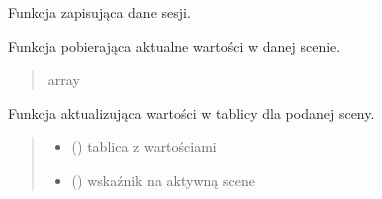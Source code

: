 \documentclass[a4paper,10pt,openany,english]{sphinxmanual}
\begin{document}

\begin{fulllineitems}
\label{\detokenize{js/js-functions:saveSessionData}}
\pysigstartsignatures
\pysiglinewithargsret
{}
{}
{}
\pysigstopsignatures
\sphinxAtStartPar
Funkcja zapisująca dane sesji.

\end{fulllineitems}


\begin{fulllineitems}
\label{\detokenize{js/js-functions:fetchSceneValues}}
\pysigstartsignatures
\pysiglinewithargsret
{}
{}
{}
\pysigstopsignatures
\sphinxAtStartPar
Funkcja pobierająca aktualne wartości w danej scenie.
\begin{quote}\begin{description}
\sphinxAtStartPar
array

\end{description}\end{quote}

\end{fulllineitems}


\begin{fulllineitems}
\label{\detokenize{js/js-functions:updateSceneValues}}
\pysigstartsignatures
\pysiglinewithargsret
{}
{\sphinxparamcomma {}}
{}
\pysigstopsignatures
\sphinxAtStartPar
Funkcja aktualizująca wartości w tablicy dla podanej sceny.
\begin{quote}\begin{description}
\begin{itemize}
\item {} 
\sphinxAtStartPar
{} () \textendash{} tablica z wartościami

\item {} 
\sphinxAtStartPar
{} () \textendash{} wskaźnik na aktywną scene

\end{itemize}

\end{description}\end{quote}

\end{fulllineitems}
\end{document}
